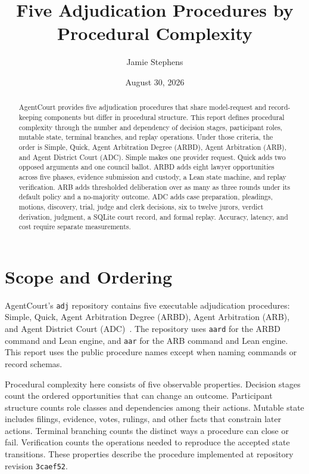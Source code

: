 \documentclass[11pt]{article}
\title{Five Adjudication Procedures by Procedural Complexity}
\author{Jamie Stephens}
\date{August 30, 2026}
\newcommand{\code}[1]{\texttt{#1}}
\begin{document}
\maketitle

\begin{abstract}
AgentCourt provides five adjudication procedures that share model-request and record-keeping components but differ in procedural structure.  This report defines procedural complexity through the number and dependency of decision stages, participant roles, mutable state, terminal branches, and replay operations.  Under those criteria, the order is Simple, Quick, Agent Arbitration Degree (ARBD), Agent Arbitration (ARB), and Agent District Court (ADC).  Simple makes one provider request.  Quick adds two opposed arguments and one council ballot.  ARBD adds eight lawyer opportunities across five phases, evidence submission and custody, a Lean state machine, and replay verification.  ARB adds thresholded deliberation over as many as three rounds under its default policy and a no-majority outcome.  ADC adds case preparation, pleadings, motions, discovery, trial, judge and clerk decisions, six to twelve jurors, verdict derivation, judgment, a SQLite court record, and formal replay.  Accuracy, latency, and cost require separate measurements.
\end{abstract}

\section{Scope and Ordering}

AgentCourt's \code{adj} repository contains five executable adjudication procedures: Simple, Quick, Agent Arbitration Degree (ARBD), Agent Arbitration (ARB), and Agent District Court (ADC)~\cite{adjrepo}.  The repository uses \code{aard} for the ARBD command and Lean engine, and \code{aar} for the ARB command and Lean engine.  This report uses the public procedure names except when naming commands or record schemas.

Procedural complexity here consists of five observable properties.  Decision stages count the ordered opportunities that can change an outcome.  Participant structure counts role classes and dependencies among their actions.  Mutable state includes filings, evidence, votes, rulings, and other facts that constrain later actions.  Terminal branching counts the distinct ways a procedure can close or fail.  Verification counts the operations needed to reproduce the accepted state transitions.  These properties describe the procedure implemented at repository revision \code{3caef52}.
\end{document}
